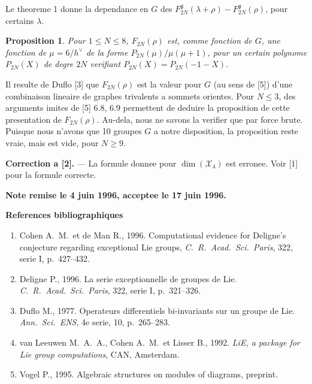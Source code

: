 \documentclass[11pt,a4paper]{article}
\theoremstyle{plain}
\newtheorem{proposition}[theorem]{Proposition}
\theoremstyle{definition}
\begin{document}
\smallskip

Le theoreme 1 donne la dependance en $G$ des $F_{2N}^{\mathfrak{g}}(\lambda + \rho) - F_{2N}^{\mathfrak{g}}(\rho)$, pour certains $\lambda$.

\begin{proposition}\label{prop:2}
Pour $1 \leq N \leq 8$, $F_{2N}(\rho)$ est, comme fonction de $G$, une fonction de $\mu = 6/h^\vee$ de la forme $P_{2N}(\mu)/\mu(\mu+1)$, pour un certain polynome $P_{2N}(X)$ de degre $2N$ verifiant $P_{2N}(X) = P_{2N}(-1-X)$.
\end{proposition}

Il resulte de Duflo [3] que $F_{2N}(\rho)$ est la valeur pour $G$ (au sens de [5]) d'une combinaison lineaire de graphes trivalents a sommets orientes. Pour $N \leq 3$, des arguments imites de [5] 6.8, 6.9 permettent de deduire la proposition de cette presentation de $F_{2N}(\rho)$. Au-dela, nous ne savons la verifier que par force brute. Puisque nous n'avons que 10 groupes $G$ a notre disposition, la proposition reste vraie, mais est vide, pour $N \geq 9$.

\bigskip

\textbf{Correction a [2].} --- La formule donnee pour $\dim(\mathcal{X}_4)$ est erronee. Voir [1] pour la formule correcte.

\bigskip

\noindent\textbf{Note remise le 4 juin 1996, acceptee le 17 juin 1996.}

\bigskip

\begin{center}
\textbf{References bibliographiques}
\end{center}

\begin{enumerate}
\item[{[1]}] Cohen A.\ M.\ et de Man R., 1996. Computational evidence for Deligne's conjecture regarding exceptional Lie groups, \textit{C.\ R.\ Acad.\ Sci.\ Paris}, 322, serie I, p.~427--432.

\item[{[2]}] Deligne P., 1996. La serie exceptionnelle de groupes de Lie. \textit{C.\ R.\ Acad.\ Sci.\ Paris}, 322, serie I, p.~321--326.

\item[{[3]}] Duflo M., 1977. Operateurs differentiels bi-invariants sur un groupe de Lie. \textit{Ann.\ Sci.\ ENS}, 4e serie, 10, p.~265--283.

\item[{[4]}] van Leeuwen M.\ A.\ A., Cohen A.\ M.\ et Lisser B., 1992. \textit{LiE, a package for Lie group computations}, CAN, Amsterdam.

\item[{[5]}] Vogel P., 1995. Algebraic structures on modules of diagrams, preprint.
\end{enumerate}
\end{document}
